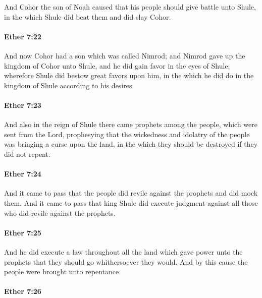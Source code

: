 			And Cohor the son of Noah caused
			that his people should give battle unto Shule,
			in the which Shule did beat them and did slay Cohor.

		\paragraph{Ether 7:22} %
			\label{ETHER-7-22}

			And now Cohor had a son which was called Nimrod;
			and Nimrod gave up the kingdom of Cohor unto Shule,
			and he did gain favor in the eyes of Shule;
			wherefore Shule did bestow great favors upon him,
			in the which he did do in the kingdom of Shule according to his desires.

		\paragraph{Ether 7:23} %
			\label{ETHER-7-23}

			And also in the reign of Shule there came prophets among the people,
			which were sent from the Lord,
			prophesying that the wickedness and idolatry of the people
			was bringing a curse upon the land,
			in the which they should be destroyed if they did not repent.

		\paragraph{Ether 7:24} %
			\label{ETHER-7-24}

			And it came to pass that
			the people did revile against the prophets and did mock them.
			And it came to pass that king Shule did execute judgment
			against all those who did revile against the prophets.

		\paragraph{Ether 7:25} %
			\label{ETHER-7-25}

			And he did execute a law throughout all the land
			which gave power unto the prophets
			that they should go whithersoever they would.
			And by this cause the people were brought unto repentance.

		\paragraph{Ether 7:26} %
			\label{ETHER-7-26}

